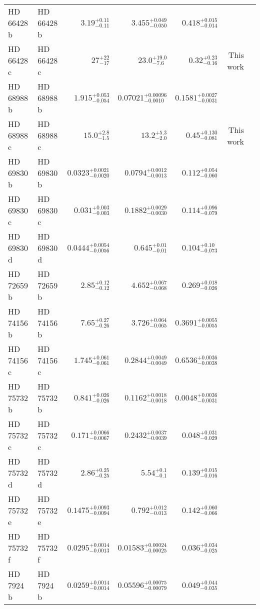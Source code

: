 \begin{longtable*}{llrrrrr}
HD 66428 b & HD 66428 b & $3.19^{+0.11}_{-0.11}$ & $3.455^{+0.049}_{-0.050}$ & $0.418^{+0.015}_{-0.014}$ & \cite{Butler06} & \\ 
HD 66428 c & HD 66428 c & $27^{+22}_{-17}$ & $23.0^{+19.0}_{-7.6}$ & $0.32^{+0.23}_{-0.16}$ & This work & \\ 
HD 68988 b & HD 68988 b & $1.915^{+0.053}_{-0.054}$ & $0.07021^{+0.00096}_{-0.0010}$ & $0.1581^{+0.0027}_{-0.0031}$ & \cite{Vogt02} & \\ 
HD 68988 c & HD 68988 c & $15.0^{+2.8}_{-1.5}$ & $13.2^{+5.3}_{-2.0}$ & $0.45^{+0.130}_{-0.081}$ & This work & \\ 
HD 69830 b & HD 69830 b & $0.0323^{+0.0021}_{-0.0020}$ & $0.0794^{+0.0012}_{-0.0013}$ & $0.112^{+0.054}_{-0.060}$ & \cite{Lovis06} & \\ 
HD 69830 c & HD 69830 c & $0.031^{+0.003}_{-0.003}$ & $0.1882^{+0.0029}_{-0.0030}$ & $0.114^{+0.096}_{-0.079}$ & \cite{Lovis06} & \\ 
HD 69830 d & HD 69830 d & $0.0444^{+0.0054}_{-0.0056}$ & $0.645^{+0.01}_{-0.01}$ & $0.104^{+0.10}_{-0.073}$ & \cite{Lovis06} & \\ 
HD 72659 b & HD 72659 b & $2.85^{+0.12}_{-0.12}$ & $4.652^{+0.067}_{-0.068}$ & $0.269^{+0.018}_{-0.026}$ & \cite{Butler03} & \\ 
HD 74156 b & HD 74156 b & $7.65^{+0.27}_{-0.26}$ & $3.726^{+0.064}_{-0.065}$ & $0.3691^{+0.0055}_{-0.0055}$ & \cite{Naef04} & \\ 
HD 74156 c & HD 74156 c & $1.745^{+0.061}_{-0.061}$ & $0.2844^{+0.0049}_{-0.0049}$ & $0.6536^{+0.0036}_{-0.0038}$ & \cite{Naef04} & \\ 
HD 75732 b & HD 75732 b & $0.841^{+0.026}_{-0.026}$ & $0.1162^{+0.0018}_{-0.0018}$ & $0.0048^{+0.0036}_{-0.0031}$ & \cite{Butler97} & \\ 
HD 75732 c & HD 75732 c & $0.171^{+0.0066}_{-0.0067}$ & $0.2432^{+0.0037}_{-0.0039}$ & $0.048^{+0.031}_{-0.029}$ & \cite{McArthur04} & \\ 
HD 75732 d & HD 75732 d & $2.86^{+0.25}_{-0.25}$ & $5.54^{+0.1}_{-0.1}$ & $0.139^{+0.015}_{-0.016}$ & \cite{Marcy02} & \\ 
HD 75732 e & HD 75732 e & $0.1475^{+0.0093}_{-0.0094}$ & $0.792^{+0.012}_{-0.013}$ & $0.142^{+0.060}_{-0.066}$ & \cite{McArthur04} & \\ 
HD 75732 f & HD 75732 f & $0.0295^{+0.0014}_{-0.0013}$ & $0.01583^{+0.00024}_{-0.00025}$ & $0.036^{+0.034}_{-0.025}$ & \cite{Fischer08} & \\ 
HD 7924 b & HD 7924 b & $0.0259^{+0.0014}_{-0.0014}$ & $0.05596^{+0.00075}_{-0.00079}$ & $0.049^{+0.044}_{-0.035}$ & \cite{Fulton15} & \\ 

\end{longtable*}
